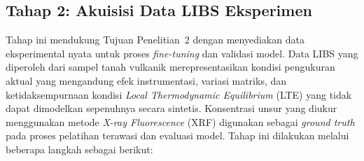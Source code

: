 \subsection{Tahap 2: Akuisisi Data LIBS Eksperimen}
Tahap ini mendukung Tujuan Penelitian~2 dengan menyediakan data eksperimental nyata untuk proses \textit{fine-tuning} dan validasi model. Data LIBS yang diperoleh dari sampel tanah vulkanik merepresentasikan kondisi pengukuran aktual yang mengandung efek instrumentasi, variasi matriks, dan ketidaksempurnaan kondisi \textit{Local Thermodynamic Equilibrium} (LTE) yang tidak dapat dimodelkan sepenuhnya secara sintetis. Konsentrasi unsur yang diukur menggunakan metode \textit{X-ray Fluorescence} (XRF) digunakan sebagai \textit{ground truth} pada proses pelatihan terawasi dan evaluasi model. Tahap ini dilakukan melalui beberapa langkah sebagai berikut:

